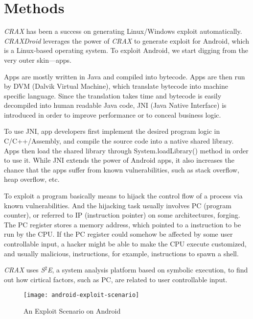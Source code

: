 \chapter{Methods}

\emph{CRAX}\autocite{huang2012crax} has been a success on generating
Linux/Windows exploit automatically. \emph{CRAXDroid} leverages the power of
\emph{CRAX} to generate exploit for Android, which is a Linux-based operating
system. To exploit Android, we start digging from the very outer skin---apps.

Apps are mostly written in Java and compiled into bytecode. Apps are then run
by DVM (Dalvik Virtual Machine), which translate bytecode into machine specific
language. Since the translation takes time and bytecode is easily decompiled
into human readable Java code, JNI (Java Native Interface) is introduced in
order to improve performance or to conceal business logic.

To use JNI, app developers first implement the desired program logic in
C/C++/Assembly, and compile the source code into a native shared library. Apps
then load the shared library through System.loadLibrary() method in order to
use it. While JNI extends the power of Android apps, it also increases the
chance that the apps suffer from known vulnerabilities, such as stack overflow,
heap overflow, etc.

To exploit a program basically means to hijack the control flow of a process
via known vulnerabilities. And the hijacking task usually involves PC (program
counter), or referred to IP (instruction pointer) on some architectures,
forging. The PC register stores a memory address, which pointed to a
instruction to be run by the CPU. If the PC register could somehow be affected
by some user controllable input, a hacker might be able to make the CPU execute
customized, and usually malicious, instructions, for example, instructions to
spawn a shell.

\emph{CRAX} uses \emph{S$^{2}$E}\autocite{chipounov2011s2e}, a system analysis
platform based on symbolic execution, to find out how cirtical factors, such as
PC, are related to user controllable input.

\begin{figure}[!ht]
  \texttt{[image: android-exploit-scenario]}
  \caption{An Exploit Scenario on Android}
  \label{fig:android-exploit-scenario}
\end{figure}
